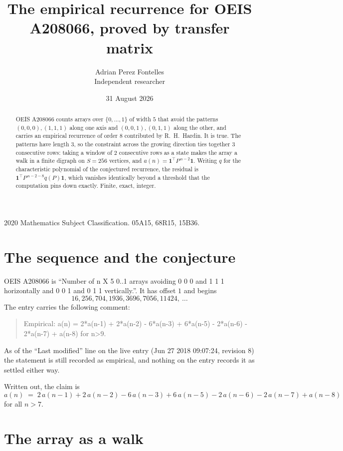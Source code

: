 \documentclass[11pt,a4paper]{article}
\title{The empirical recurrence for OEIS A208066, proved by transfer matrix}
\author{Adrian Perez Fontelles\\ \small Independent researcher}
\date{31 August 2026}
\theoremstyle{plain}
\theoremstyle{definition}
\begin{document}
\maketitle

\begin{abstract}
OEIS A208066 counts arrays over $\{0,\dots,1\}$ of width $5$ that avoid the patterns
$(0,0,0), (1,1,1)$ along one axis and $(0,0,1), (0,1,1)$ along the other, and carries an empirical recurrence of
order $8$ contributed by R.~H.~Hardin. It is true. The patterns have length $3$, so
the constraint across the growing direction ties together $3$ consecutive rows: taking a
window of $2$ consecutive rows as a state makes the array a walk in a finite digraph
on $S=256$ vertices, and $a(n)=\mathbf{1}^{\!\top}P^{\,n-2}\mathbf{1}$. Writing $q$
for the characteristic polynomial of the conjectured recurrence, the residual is
$\mathbf{1}^{\!\top}P^{\,n-2-8}q(P)\mathbf{1}$, which vanishes identically
beyond a threshold that the computation pins down exactly. Finite, exact, integer.
\end{abstract}

\noindent\small 2020 Mathematics Subject Classification. 05A15, 68R15, 15B36.\normalsize

\section{The sequence and the conjecture}

OEIS A208066 is ``Number of n X 5 0..1 arrays avoiding 0 0 0 and 1 1 1 horizontally and 0 0 1 and 0 1 1 vertically.''. It has offset
$1$ and begins
\[
16, 256, 704, 1936, 3696, 7056, 11424,\ \dots
\]
The entry carries the following comment:
\begin{quote}\small
Empirical: a(n) = 2*a(n-1) + 2*a(n-2) - 6*a(n-3) + 6*a(n-5) - 2*a(n-6) - 2*a(n-7) + a(n-8) for n>9.
\end{quote}
As of the ``Last modified'' line on the live entry (Jun 27 2018 09:07:24, revision
8) the statement is still recorded as empirical, and nothing on the entry
records it as settled either way.

Written out, the claim is
\begin{equation}\label{eq:conj}
a(n)\;=\;2\,a(n-1) + 2\,a(n-2) - 6\,a(n-3) + 6\,a(n-5) - 2\,a(n-6) - 2\,a(n-7) + a(n-8)
\end{equation}
for all $n>7$. 

\section{The array as a walk}
\end{document}
